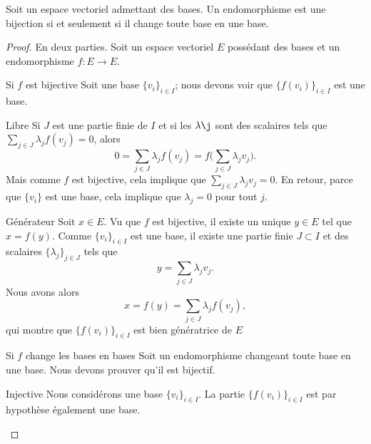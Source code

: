 \begin{lemma}        \label{LEMooDJSIooYcsvhO}
    Soit un espace vectoriel admettant des bases. Un endomorphisme est une bijection si et seulement si il change toute base en une base.
\end{lemma}

\begin{proof}
    En deux parties. Soit un espace vectoriel \( E\) possédant des bases et un endomorphisme \( f\colon E\to E\).
    \begin{subproof}
        \item[Si \( f\) est bijective]
            Soit une base \( \{ v_i \}_{i\in I}\); nous devons voir que \( \{ f(v_i) \}_{i\in I}\) est une base.
            \begin{subproof}
                \item[Libre]
                    Si \( J\) est une partie finie de \( I\) et si les \( \lambda\j\) sont des scalaires tels que \( \sum_{j\in J}\lambda_jf(v_j)=0\), alors
                    \begin{equation}
                        0=\sum_{j\in J}\lambda_jf(v_j)=f\big( \sum_{j\in J}\lambda_jv_j \big).
                    \end{equation}
                    Mais comme \( f\) est bijective, cela implique que \( \sum_{j\in J}\lambda_jv_j=0\). En retour, parce que \( \{ v_i \}\) est une base, cela implique que \( \lambda_j=0\) pour tout \( j\).
                \item[Générateur]
                    Soit \( x\in E\). Vu que \( f\) est bijective, il existe un unique \( y\in E\) tel que \( x=f(y)\). Comme \( \{ v_i \}_{i\in I}\) est une base, il existe une partie finie \( J\subset I\) et des scalaires \( \{ \lambda_j \}_{j\in J}\) tels que
                    \begin{equation}
                        y=\sum_{j\in J}\lambda_jv_j.
                    \end{equation}
                    Nous avons alors
                    \begin{equation}
                        x=f(y)=\sum_{j\in J}\lambda_jf(v_j),
                    \end{equation}
                    qui montre que \( \{ f(v_i) \}_{i\in I}\) est bien génératrice de \( E\)
            \end{subproof}
        \item[Si \( f\) change les bases en bases]
            Soit un endomorphisme changeant toute base en une base. Nous devons prouver qu'il est bijectif.
            \begin{subproof}
                \item[Injective]
                    Nous considérons une base \( \{ v_i \}_{i\in I}\). La partie \( \{ f(v_i) \}_{i\in I}\) est par hypothèse également une base.


\end{subproof}
\end{subproof}
\end{proof}
